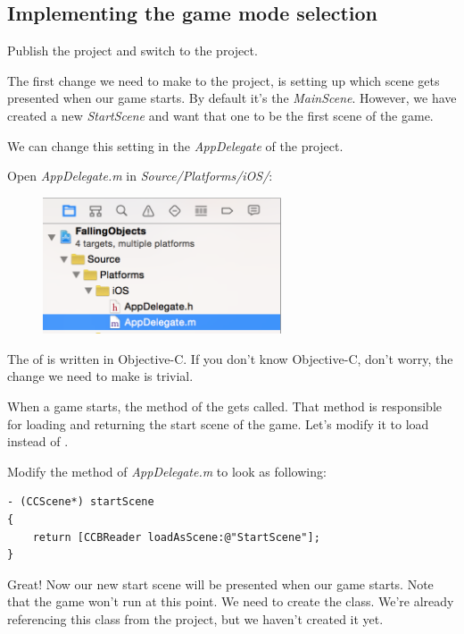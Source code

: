 \subsection{Implementing the game mode selection}

\begin{leftbar}
Publish the \SB{} project and switch to the \xcode{} project.
\end{leftbar}

The first change we need to make to the \xcode{} project, is setting up which
scene gets presented when our game starts. By default it's
the \textit{MainScene}. However, we have created a new \textit{StartScene} and want
that one to be the first scene of the game.

We can change this setting in the \textit{AppDelegate} of the project. 
\begin{leftbar}
Open \textit{AppDelegate.m} in \textit{Source/Platforms/iOS/}:
\begin{figure}[H]
		\centering
		\includegraphics[width=200pt]{images/Chapter7/app_delegate.png}
\end{figure}
\end{leftbar}

The  of \cocos{} is written in Objective-C. If you don't
know Objective-C, don't worry, the change we need to make is trivial.

When a \cocos{} game starts, the  method of the
 gets called. That method is responsible for loading and
returning the start scene of the game. Let's modify it to load
 instead of .

\begin{leftbar}
Modify the  method of \textit{AppDelegate.m} to look as
following:
\begin{lstlisting}
- (CCScene*) startScene
{
    return [CCBReader loadAsScene:@"StartScene"];
}
\end{lstlisting}
\end{leftbar}
Great! Now our new start scene will be presented when our game starts. Note
that the game won't run at this point. We need to create the
 class. We're already referencing this class from the
\SB{} project, but we haven't created it yet.

